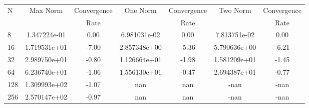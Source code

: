 \documentclass[12pt]{article}
\begin{document}
	\begin{tabular}{l|c|c|c|c|c|c}
		N&Max Norm&Convergence&One Norm&Convergence&Two Norm&Convergence\\
		&&Rate&&Rate&&Rate\\
		\hline
		8&1.347224e-01&0.00&6.981031e-02&0.00&7.813751e-02&0.00\\
		\hline
		16&1.719531e+01&-7.00&2.857348e+00&-5.36&5.790636e+00&-6.21\\
		\hline
		32&2.989750e+01&-0.80&1.126664e+01&-1.98&1.581209e+01&-1.45\\
		\hline
		64&6.236740e+01&-1.06&1.556130e+01&-0.47&2.694387e+01&-0.77\\
		\hline
		128&1.309993e+02&-1.07&nan&nan&-nan&-nan\\
		\hline
		256&2.570147e+02&-0.97&nan&nan&-nan&-nan\\
	\end{tabular}
\end{document}
